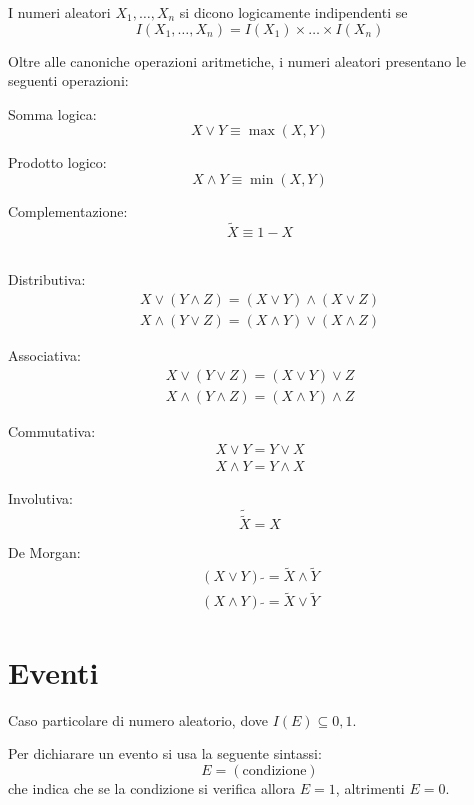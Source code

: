 \begin{definition}
  I numeri aleatori $X_1, \ldots, X_n$ si dicono logicamente indipendenti se $$I(X_1, \ldots, X_n) = I(X_1) \times \ldots \times I(X_n)$$
\end{definition}

\begin{definition}
  Oltre alle canoniche operazioni aritmetiche, i numeri aleatori presentano le seguenti operazioni:

  Somma logica:
  \[ X \vee Y \equiv \max(X,Y) \]

  Prodotto logico:
  \[ X \wedge Y \equiv \min(X,Y) \]

  Complementazione:
  \[ \tilde{X} \equiv 1 - X \]
\end{definition}

\begin{proposition}{\ \\} %
  Distributiva:
  \begin{align*}
    X \vee (Y \wedge Z) = (X \vee Y) \wedge (X \vee Z) \\
    X \wedge (Y \vee Z) = (X \wedge Y) \vee (X \wedge Z)
  \end{align*}

  Associativa:
  \begin{align*}
    X \vee (Y \vee Z) = (X \vee Y) \vee Z \\
    X \wedge (Y \wedge Z) = (X \wedge Y) \wedge Z
  \end{align*}

  Commutativa:
  \begin{align*}
    X \vee Y = Y \vee X \\
    X \wedge Y = Y \wedge X
  \end{align*}


  Involutiva:
  \[ \tilde{\tilde{X}} = X \]
  
  De Morgan:
  \begin{align*}
    (X \vee Y) \; \tilde{} = \tilde{X} \wedge \tilde{Y} \\
    (X \wedge Y) \; \tilde{} = \tilde{X} \vee \tilde{Y}
  \end{align*}

\end{proposition}

\section{Eventi}
\begin{definition}[Evento]\label{def:evento}
  Caso particolare di numero aleatorio, dove \( I(E) \subseteq {0,1} \).
\end{definition}
Per dichiarare un evento si usa la seguente sintassi:
\[ E = (\text{condizione}) \]
che indica che se la condizione si verifica allora \( E = 1 \), altrimenti \( E = 0 \).

